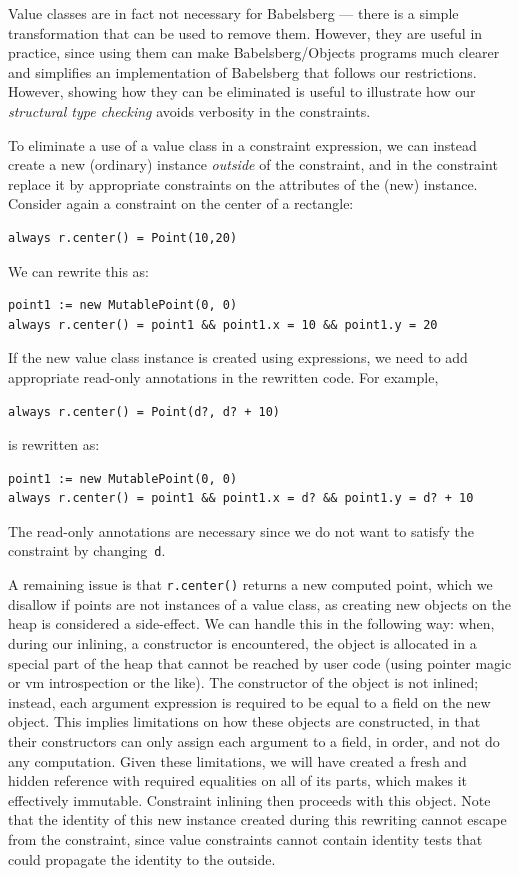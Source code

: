 Value classes are in fact not necessary for Babelsberg --- there is a
simple transformation that can be used to remove them.  However, they
are useful in practice, since using them can make Babelsberg/Objects
programs much clearer and simplifies an implementation of Babelsberg
that follows our restrictions. However, showing how they can be
eliminated is useful to illustrate how our \emph{structural type
  checking} avoids verbosity in the constraints.

To eliminate a use of a value class in a constraint expression, we can
instead create a new (ordinary) instance \emph{outside} of the
constraint, and in the constraint replace it by appropriate
constraints on the attributes of the (new) instance.  Consider again a
constraint on the center of a rectangle:
\begin{lstlisting}
always r.center() = Point(10,20)
\end{lstlisting}
We can rewrite this as:
\begin{lstlisting}
point1 := new MutablePoint(0, 0)
always r.center() = point1 && point1.x = 10 && point1.y = 20
\end{lstlisting}
If the new value class instance is created using expressions, we need
to add appropriate read-only annotations in the rewritten code.  For
example,
\begin{lstlisting}
always r.center() = Point(d?, d? + 10)
\end{lstlisting}
is rewritten as:
\begin{lstlisting}
point1 := new MutablePoint(0, 0)
always r.center() = point1 && point1.x = d? && point1.y = d? + 10
\end{lstlisting}
The read-only annotations are necessary since we do not want to satisfy
the constraint by changing~\verb|d|.

A remaining issue is that \verb!r.center()! returns a new computed
point, which we disallow if points are not instances of a value class,
as creating new objects on the heap is considered a side-effect. We
can handle this in the following way: when, during our inlining, a
constructor is encountered, the object is allocated in a special part
of the heap that cannot be reached by user code (using pointer magic
or \ac{vm} introspection or the like). The constructor of the object
is not inlined; instead, each argument expression is required to be
equal to a field on the new object. This implies limitations on how
these objects are constructed, in that their constructors can only
assign each argument to a field, in order, and not do any
computation. Given these limitations, we will have created a fresh and
hidden reference with required equalities on all of its parts, which
makes it effectively immutable. Constraint inlining then proceeds with
this object. Note that the identity of this new instance created
during this rewriting cannot escape from the constraint, since value
constraints cannot contain identity tests that could propagate the
identity to the outside.


